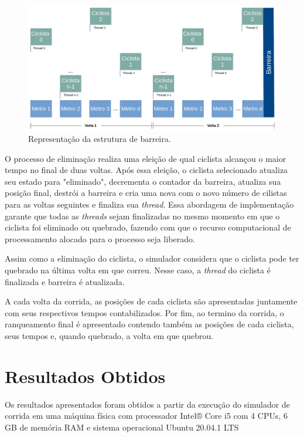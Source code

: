 \documentclass[12pt]{article}
\begin{document}
\begin{figure}[H]
	\centering
	\includegraphics[width=1\textwidth]{barrier.png}
	\caption{Representação da estrutura de barreira.}
	\label{fig:barrier}
\end{figure}

O processo de eliminação realiza uma eleição de qual ciclista alcançou o maior tempo no final de duas voltas. Após essa eleição, o ciclista selecionado atualiza seu estado para "eliminado", decrementa o contador da barreira, atualiza sua posição final, destrói a barreira e cria uma nova com o novo número de cilistas para as voltas seguintes e finaliza sua \textit{thread}. Essa abordagem de implementação garante que todas as \textit{threads} sejam finalizadas no mesmo momento em que o ciclista foi eliminado ou quebrado, fazendo com que o recurso computacional de processamento alocado para o processo seja liberado.

Assim como a eliminação do ciclista, o simulador considera que o ciclista pode ter quebrado na última volta em que correu. Nesse caso, a \textit{thread} do ciclista é finalizada e barreira é atualizada.

A cada volta da corrida, as posições de cada ciclista são apresentadas juntamente com seus respectivos tempos contabilizados. Por fim, ao termino da corrida, o ranqueamento final é apresentado contendo também as posições de cada ciclista, seus tempos e, quando quebrado, a volta em que quebrou.


\section{Resultados Obtidos}

Os resultados apresentados foram obtidos a partir da execução do simulador de corrida em uma máquina física com processador Intel® Core i5 com 4 CPUs, 6 GB de memória RAM e sistema operacional Ubuntu 20.04.1 LTS
\end{document}
